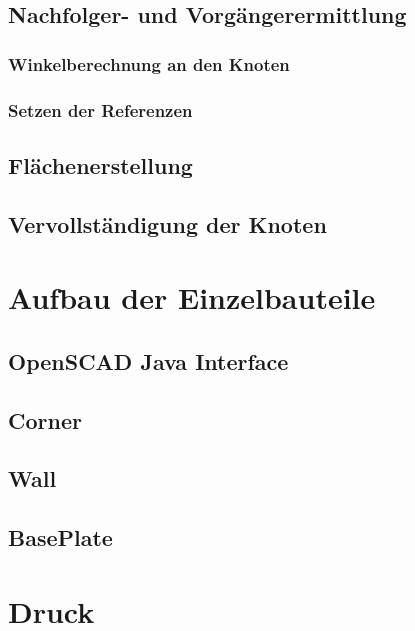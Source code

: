 \subsection{Nachfolger- und Vorgängerermittlung}
\subsubsection{Winkelberechnung an den Knoten}
\subsubsection{Setzen der Referenzen}

\subsection{Flächenerstellung}

\subsection{Vervollständigung der Knoten}

\section{Aufbau der Einzelbauteile}
\subsection{OpenSCAD Java Interface}
\subsection{Corner}
\subsection{Wall}
\subsection{BasePlate}

\section{Druck}
\subsection{}

